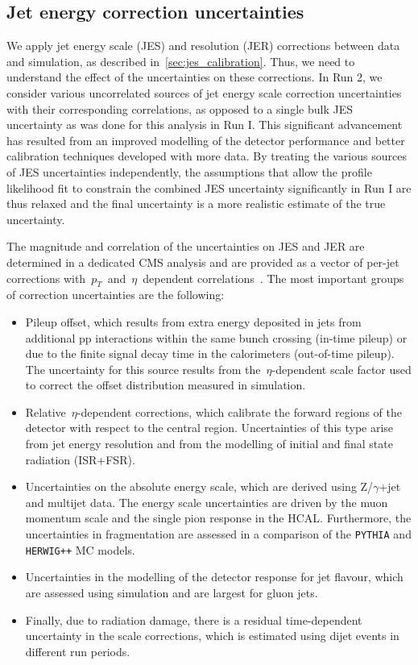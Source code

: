 \begin{table}[h!]
\begin{center}
\label{tab:systematic_uncertainties_prior}
\end{center}
\end{table}

\subsection{Jet energy correction uncertainties}
\label{sec:jec_unc}
We apply jet energy scale (JES) and resolution (JER) corrections between data and simulation, as described in~\cref{sec:jes_calibration}. Thus, we need to understand the effect of the uncertainties on these corrections. In Run 2, we consider various uncorrelated sources of jet energy scale correction uncertainties with their corresponding correlations, as opposed to a single bulk JES uncertainty as was done for this analysis in Run I. This significant advancement has resulted from an improved modelling of the detector performance and better calibration techniques developed with more data. By treating the various sources of JES uncertainties independently, the assumptions that allow the profile likelihood fit to constrain the combined JES uncertainty significantly in Run I are thus relaxed and the final uncertainty is a more realistic estimate of the true uncertainty.

The magnitude and correlation of the uncertainties on JES and JER are determined in a dedicated CMS analysis and are provided as a vector of per-jet corrections with~$p_T$~and~$\eta$~dependent correlations~\cite{cms_jec_2017}. The most important groups of correction uncertainties are the following:

\begin{itemize}
\item Pileup offset, which results from extra energy deposited in jets from additional pp interactions within the same bunch crossing (in-time pileup) or due to the finite signal decay time in the calorimeters (out-of-time pileup). The uncertainty for this source results from the~$\eta$-dependent scale factor used to correct the offset distribution measured in simulation.
\item Relative~$\eta$-dependent corrections, which calibrate the forward regions of the detector with respect to the central region. Uncertainties of this type arise from jet energy resolution and from the modelling of initial and final state radiation (ISR+FSR).
\item Uncertainties on the absolute energy scale, which are derived using Z/$\gamma$+jet and multijet data. The energy scale uncertainties are driven by the muon momentum scale and the single pion response in the HCAL. Furthermore, the uncertainties in fragmentation are assessed in a comparison of the \texttt{PYTHIA} and \texttt{HERWIG++} MC models.
\item Uncertainties in the modelling of the detector response for jet flavour, which are assessed using simulation and are largest for gluon jets.
\item Finally, due to radiation damage, there is a residual time-dependent uncertainty in the scale corrections, which is estimated using dijet events in different run periods.
\end{itemize}

